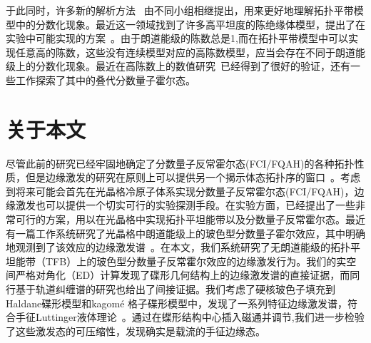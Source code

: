 于此同时，许多新的解析方法~\cite{Qi2011,Barkeshli2012a,Wu2013,Lee2013,Jian2013} \cite{Parameswaran2011,Goerbig2012,Murthy2011,Murthy2012} \cite{Lu2012,McGreevy2012,Zhang2013} \cite{Scaffidi2012,Wu2012a,Liu2013}
由不同小组相继提出，用来更好地理解拓扑平带模型中的分数化现象。最近这一领域找到了许多高平坦度的陈绝缘体模型，提出了在实验中可能实现的方案~\cite{Liu2013a,Cooper2013,Shi2013,Yannopapas2012,Zhang2013a,Grushin2012,Trescher2012,Chen2012,Weeks2012,Hu2011,Venderbos2011,Ghaemi2012,Wang2011a,Venderbos2012,Liu2012a,Yang2012,Xiao2011,Yao2013}。由于朗道能级的陈数总是1,而在拓扑平带模型中可以实现任意高的陈数，这些没有连续模型对应的高陈数模型，应当会存在不同于朗道能级上的分数化现象。最近在高陈数上的数值研究~\cite{Wang2012,Liu2012,Sterdyniak2013}已经得到了很好的验证，还有一些工作探索了其中的叠代分数量子霍尔态\cite{Liu2013b,Lauchli2013}。





\section{关于本文}
尽管此前的研究已经牢固地确定了分数量子反常霍尔态(FCI/FQAH)的各种拓扑性质，但是边缘激发的研究在原则上可以提供另一个揭示体态拓扑序的窗口~\cite{Wen1995}。考虑到将来可能会首先在光晶格冷原子体系实现分数量子反常霍尔态(FCI/FQAH)，边缘激发也可以提供一个切实可行的实验探测手段。在实验方面，已经提出了一些非常可行的方案，用以在光晶格中实现拓扑平坦能带以及分数量子反常霍尔态。最近有一篇工作系统研究了光晶格中朗道能级上的玻色型分数量子霍尔效应，其中明确地观测到了该效应的边缘激发谱~\cite{Kjall2012}。在本文，我们系统研究了无朗道能级的拓扑平坦能带（TFB）上的玻色型分数量子反常霍尔效应的边缘激发行为。我们的实空间严格对角化（ED）计算发现了碟形几何结构上的边缘激发谱的直接证据，而同行基于轨道纠缠谱的研究也给出了间接证据。我们考虑了硬核玻色子填充到Haldane碟形模型和kagom\'{e} 格子碟形模型中，发现了一系列特征边缘激发谱，符合手征Luttinger液体理论~\cite{Wen1995}。通过在蝶形结构中心插入磁通并调节,我们进一步检验了这些激发态的可压缩性，发现确实是载流的手征边缘态。

